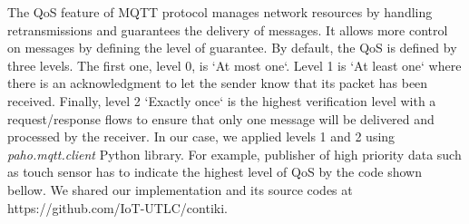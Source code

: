 \documentclass[conference]{../../setup/IEEEtran}
\begin{document}






The QoS feature of MQTT protocol manages network resources by handling retransmissions and guarantees the delivery of messages. It allows more control on messages by defining the level of guarantee. By default, the QoS is defined by three levels. The first one, level 0, is `At most one`. Level 1 is `At least one` where there is an acknowledgment to let the sender know that its packet has been received. Finally, level 2 `Exactly once` is the highest verification level with a request/response flows to ensure that only one message will be delivered and processed by the receiver. In our case, we applied levels 1 and 2 using \textit{paho.mqtt.client} Python library.  
%
For example, publisher of high priority data such as touch sensor has to indicate the highest level of QoS by the code shown bellow. 
We shared our implementation and its source codes at https://github.com/IoT-UTLC/contiki.
%
\end{document}
